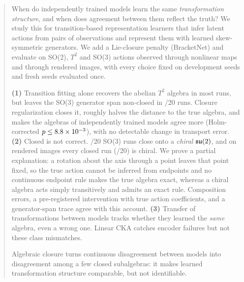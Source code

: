 \begin{abstract}
When do independently trained models learn the same \emph{transformation structure}, and when does agreement between
them reflect the truth? We study this for transition-based representation learners that infer latent actions from
pairs of observations and represent them with learned skew-symmetric generators. We add a Lie-closure penalty
(BracketNet) and evaluate on SO(2), $T^2$ and SO(3) actions observed through nonlinear maps and through rendered
images, with every choice fixed on development seeds and fresh seeds evaluated once.

\textbf{(1)} Transition fitting alone recovers the abelian $T^2$ algebra in most runs, but leaves the SO(3) generator
span non-closed in \NSOthreeCompCatNonclosed/20 runs. Closure regularization closes it, roughly halves the distance to
the true algebra, and makes the algebras of independently trained models agree more (Holm-corrected
$p\le\NHthreeSOthreeHolmp$), with no detectable change in transport error.
\textbf{(2)} Closed is not correct. \NSOthreeBNChiral/20 SO(3) runs close onto a \emph{chiral} $\su(2)$, and on
rendered images every closed run (\REfourBracketnetChiral/20) is chiral. We prove a partial
explanation: a rotation about the axis through a point leaves that point fixed, so the true action cannot be inferred
from endpoints and no continuous endpoint rule makes the true algebra exact, whereas a chiral algebra acts simply
transitively and admits an exact rule. Composition errors, a pre-registered intervention with true action coefficients, and a generator-span trace
agree with this account.
\textbf{(3)} Transfer of transformations between models tracks whether they learned the \emph{same} algebra, even a
wrong one. Linear CKA catches encoder failures but not these class mismatches.

Algebraic closure turns continuous disagreement between models into disagreement among a few closed subalgebras: it
makes learned transformation structure comparable, but not identifiable.
\end{abstract}

